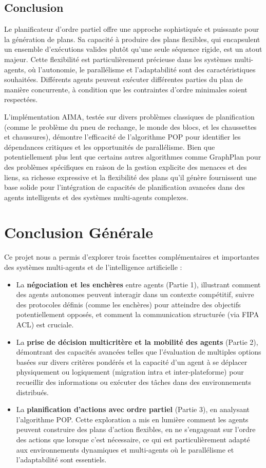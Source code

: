 \documentclass[a4paper,12pt]{report}
\begin{document}
\section{Conclusion}
Le planificateur d'ordre partiel offre une approche sophistiquée et puissante pour la génération de plans. Sa capacité à produire des plans flexibles, qui encapsulent un ensemble d'exécutions valides plutôt qu'une seule séquence rigide, est un atout majeur. Cette flexibilité est particulièrement précieuse dans les systèmes multi-agents, où l'autonomie, le parallélisme et l'adaptabilité sont des caractéristiques souhaitées. Différents agents peuvent exécuter différentes parties du plan de manière concurrente, à condition que les contraintes d'ordre minimales soient respectées.

L'implémentation AIMA, testée sur divers problèmes classiques de planification (comme le problème du pneu de rechange, le monde des blocs, et les chaussettes et chaussures), démontre l'efficacité de l'algorithme POP pour identifier les dépendances critiques et les opportunités de parallélisme. Bien que potentiellement plus lent que certains autres algorithmes comme GraphPlan pour des problèmes spécifiques en raison de la gestion explicite des menaces et des liens, sa richesse expressive et la flexibilité des plans qu'il génère fournissent une base solide pour l'intégration de capacités de planification avancées dans des agents intelligents et des systèmes multi-agents complexes.

\chapter{Conclusion Générale}

Ce projet nous a permis d'explorer trois facettes complémentaires et importantes des systèmes multi-agents et de l'intelligence artificielle :

\begin{itemize}
    \item La \textbf{négociation et les enchères} entre agents (Partie 1), illustrant comment des agents autonomes peuvent interagir dans un contexte compétitif, suivre des protocoles définis (comme les enchères) pour atteindre des objectifs potentiellement opposés, et comment la communication structurée (via FIPA ACL) est cruciale.
    \item La \textbf{prise de décision multicritère et la mobilité des agents} (Partie 2), démontrant des capacités avancées telles que l'évaluation de multiples options basées sur divers critères pondérés et la capacité d'un agent à se déplacer physiquement ou logiquement (migration intra et inter-plateforme) pour recueillir des informations ou exécuter des tâches dans des environnements distribués.
    \item La \textbf{planification d'actions avec ordre partiel} (Partie 3), en analysant l'algorithme POP. Cette exploration a mis en lumière comment les agents peuvent construire des plans d'action flexibles, en ne s'engageant sur l'ordre des actions que lorsque c'est nécessaire, ce qui est particulièrement adapté aux environnements dynamiques et multi-agents où le parallélisme et l'adaptabilité sont essentiels.
\end{itemize}
\end{document}
